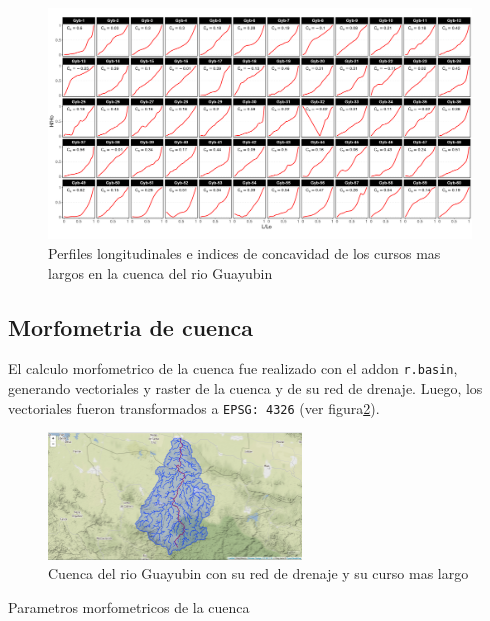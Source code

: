 \documentclass[11pt,]{article}
\begin{document}
\begin{figure}
\centering
\includegraphics[width=1.00000\textwidth]{Indices de concavidad.png}
\caption{Perfiles longitudinales e indices de concavidad de los cursos
mas largos en la cuenca del rio Guayubin\label{indicec}}
\end{figure}

\subsection{Morfometria de cuenca}\label{morfometria-de-cuenca}

El calculo morfometrico de la cuenca fue realizado con el addon
\texttt{r.basin}, generando vectoriales y raster de la cuenca y de su
red de drenaje. Luego, los vectoriales fueron transformados a
\texttt{EPSG:\ 4326} (ver figura\ref{vectoresrbasin}).

\begin{figure}
\centering
\includegraphics[width=0.60000\textwidth]{cuenca-red de drenaje-curso mas largo.png}
\caption{Cuenca del rio Guayubin con su red de drenaje y su curso mas
largo\label{vectoresrbasin}}
\end{figure}

Parametros morfometricos de la cuenca
\end{document}
